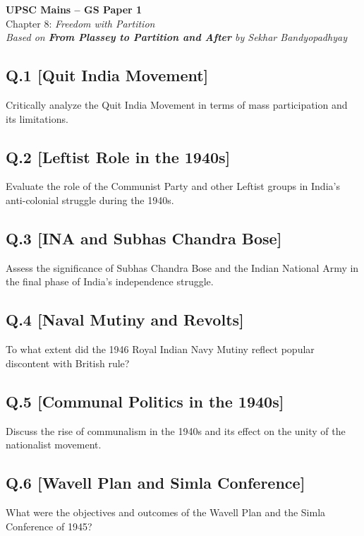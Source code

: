 \begin{center}
    \Large\textbf{UPSC Mains – GS Paper 1}\\
    \normalsize Chapter 8: \textit{Freedom with Partition}\\
    \vspace{0.5em}
    \textit{Based on \textbf{From Plassey to Partition and After} by Sekhar Bandyopadhyay}
\end{center}

\vspace{1em}

\subsection*{Q.1 [Quit India Movement]}
Critically analyze the Quit India Movement in terms of mass participation and its limitations.

\subsection*{Q.2 [Leftist Role in the 1940s]}
Evaluate the role of the Communist Party and other Leftist groups in India’s anti-colonial struggle during the 1940s.

\subsection*{Q.3 [INA and Subhas Chandra Bose]}
Assess the significance of Subhas Chandra Bose and the Indian National Army in the final phase of India’s independence struggle.

\subsection*{Q.4 [Naval Mutiny and Revolts]}
To what extent did the 1946 Royal Indian Navy Mutiny reflect popular discontent with British rule?

\subsection*{Q.5 [Communal Politics in the 1940s]}
Discuss the rise of communalism in the 1940s and its effect on the unity of the nationalist movement.

\subsection*{Q.6 [Wavell Plan and Simla Conference]}
What were the objectives and outcomes of the Wavell Plan and the Simla Conference of 1945?

